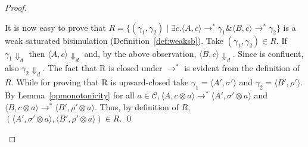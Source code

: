 \documentclass[main.tex]{subfiles}
\begin{document}
\begin{proof}
\begin{description}
		It is now easy to prove that
		$R = \{(\gamma_1, \gamma_2) \mid \exists c. \langle A, c \rangle \longrightarrow^* \gamma_1 \& \langle B, c\rangle \longrightarrow^* \gamma_2\}$
		is a weak saturated bisimulation (Definition~\ref{def:weaksb}). Take $(\gamma_1 , \gamma_2 ) \in R$.
		If $\gamma_1 \Downarrow_d$ then $\langle A, c\rangle \Downarrow_d$ and, by the above observation, $\langle B, c\rangle \Downarrow_d$. Since \SCCP is
		confluent, also $\gamma_2 \Downarrow_d$.
		The fact that R is closed under $\longrightarrow^*$ is evident from the definition of $R$. While
		for proving that R is upward-closed take $\gamma_1 = \langle A', \sigma'\rangle$ and $\gamma_2 = \langle B', \rho'\rangle$. By Lemma~\ref{opmonotonicity}  for all $a \in \mathcal{C}, \langle A, c \otimes a\rangle \longrightarrow^* \langle A', \sigma' \otimes a \rangle$ and $\langle B, c \otimes a\rangle \longrightarrow^* \langle B', \rho'  \otimes a \rangle$. Thus, by definition of $R$, $(\langle A',\sigma' \otimes a \rangle, \langle B',\rho' \otimes a\rangle) \in R$. \qed
	\end{description} 
\end{proof}
\end{document}
